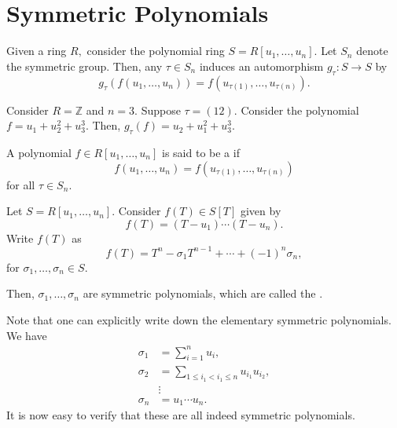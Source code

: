 
\chapter{Symmetric Polynomials}

\begin{defn}%
    Given a ring $R,$ consider the polynomial ring $S = R[u_1, \ldots, u_n].$ Let $S_n$ denote the symmetric group. Then, any $\tau \in S_n$ induces an automorphism $g_{\tau} : S \to S$ by
    \begin{equation*} 
        g_{\tau}(f(u_1, \ldots, u_n)) = f(u_{\tau(1)}, \ldots, u_{\tau(n)}).
    \end{equation*}
\end{defn}

\begin{ex}
    Consider $R = \mathbb{Z}$ and $n = 3.$ Suppose $\tau = (12).$ Consider the polynomial $f = u_1 + u_2^2 + u_3^3.$ Then, $g_{\tau}(f) = u_2 + u_1^2 + u_3^3.$
\end{ex}

\begin{defn}%
    A polynomial $f \in R[u_1, \ldots, u_n]$ is said to be a  if 
    \begin{equation*} 
        f(u_1, \ldots, u_n) = f(u_{\tau(1)}, \ldots, u_{\tau(n)})
    \end{equation*} 
    for all $\tau \in S_n.$
\end{defn}

\begin{defn}%
    Let $S = R[u_1, \ldots, u_n].$ Consider $f(T) \in S[T]$ given by
    \begin{equation*} 
        f(T) = (T - u_1) \cdots (T - u_n).
    \end{equation*}
    Write $f(T)$ as 
    \begin{equation*} 
        f(T) = T^n - \sigma_1 T^{n - 1} + \cdots + (-1)^n \sigma_n,
    \end{equation*}
    for $\sigma_1, \ldots, \sigma_n \in S.$

    Then, $\sigma_1, \ldots, \sigma_n$ are symmetric polynomials, which are called the .
\end{defn}

\begin{rem}
    Note that one can explicitly write down the elementary symmetric polynomials. We have
    \begin{align*} 
        \sigma_1 &= \sum_{i = 1}^{n} u_i,\\
        \sigma_2 &= \sum_{1 \le i_1 < i_1 \le n} u_{i_1}u_{i_2},\\
        & \vdots \\
        \sigma_n &= u_1 \cdots u_n.
    \end{align*}
    It is now easy to verify that these are all indeed symmetric polynomials.
\end{rem}

